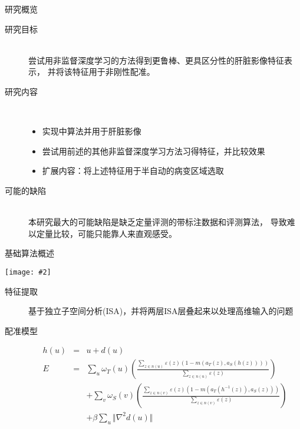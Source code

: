 \documentclass {beamer}
\newcommand{\addgraph}[2]{\begin{center}
\texttt{[image: \#2]}\end{center}}
\begin{document}
\begin{frame}{研究概览}
    \begin{description}
        \item[研究目标] \hfill \\
            尝试用非监督深度学习的方法得到更鲁棒、更具区分性的肝脏影像特征表示，
            并将该特征用于非刚性配准。
        \item[研究内容] \hfill \\
            \begin{itemize}
                \item 实现\cite{wu2013unsupervised}中算法并用于肝脏影像
                \item 尝试用前述的其他非监督深度学习方法习得特征，并比较效果
                \item 扩展内容：将上述特征用于半自动的病变区域选取
            \end{itemize}
        \item[可能的缺陷] \hfill \\
            本研究最大的可能缺陷是缺乏定量评测的带标注数据和评测算法，
            导致难以定量比较，可能只能靠人来直观感受。
    \end{description}
\end{frame}

\begin{frame}{基础算法概述}
    \addgraph{0.4}{res/isa.png}
    \begin{description}
        \item[特征提取\cite{wu2013unsupervised}]
            基于独立子空间分析(ISA)，并将两层ISA层叠起来以处理高维输入的问题
        \item[配准模型\cite{shen2007image}]
            \tiny
            \begin{eqnarray*}
                h(u) &=& u + d(u) \\
                E &=& \sum_{u}
                \omega_T(u)\left(\frac{
                    \sum_{z\in n(u)}\varepsilon(z)(1-m(a_T(z), a_S(h(z))))}{
                    \sum_{z\in n(u)}\varepsilon(z)}\right) \\
                & & + \sum_{v}\omega_S(v)\left(\frac{
                    \sum_{z\in n(v)}\varepsilon(z)(1-m(a_T(h^{-1}(z)), a_S(z)))}{
                    \sum_{z\in n(v)}\varepsilon(z)}\right) \\
                & & + \beta\sum_u\Vert\nabla^2d(u)\Vert
            \end{eqnarray*}
    \end{description}
\end{frame}
\end{document}
